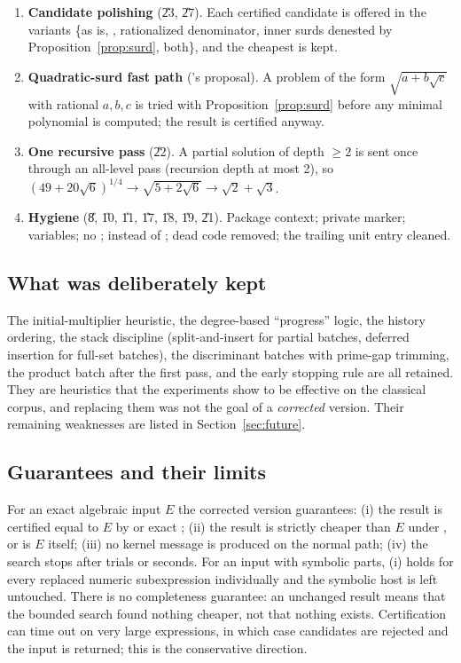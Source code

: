 \begin{enumerate}[label=\arabic*.]
      cheapest of \{input, result, , inner-surd
      variant\} that is certified equal to the input, and never anything more
      expensive than the input.
\item \textbf{Candidate polishing} (\U{23}, \U{27}). Each certified candidate
      is offered in the variants \{as is, , rationalized
      denominator, inner surds denested by Proposition~\ref{prop:surd}, both\},
      and the cheapest is kept.
\item \textbf{Quadratic-surd fast path} (\RIII's proposal). A problem of the
      form $\sqrt{a+b\sqrt c}$ with rational $a,b,c$ is tried with
      Proposition~\ref{prop:surd} before any minimal polynomial is computed;
      the result is certified anyway.
\item \textbf{One recursive pass} (\U{22}). A partial solution of depth $\ge2$
      is sent once through an all-level pass (recursion depth at most 2), so
      $(49+20\sqrt6)^{1/4}\to\sqrt{5+2\sqrt6}\to\sqrt2+\sqrt3$.
\item \textbf{Hygiene} (\U{8}, \U{10}, \U{11}, \U{17}, \U{18}, \U{19}, \U{21}).
      Package context; private marker;  variables; no
      ;  instead of ; dead code
      removed; the trailing unit entry cleaned.
\end{enumerate}

\subsection{What was deliberately kept}
The initial-multiplier heuristic, the degree-based ``progress'' logic, the
history ordering, the stack discipline (split-and-insert for partial batches,
deferred insertion for full-set batches), the discriminant batches with
prime-gap trimming, the product batch after the first pass, and the early
stopping rule are all retained. They are heuristics that the experiments show
to be effective on the classical corpus, and replacing them was not the goal
of a \emph{corrected} version. Their remaining weaknesses are listed in
Section~\ref{sec:future}.

\subsection{Guarantees and their limits}
For an exact algebraic input $E$ the corrected version guarantees: (i) the
result is certified equal to $E$ by  or exact
; (ii) the result is strictly cheaper than $E$ under
, or is $E$ itself; (iii) no kernel message is produced on
the normal path; (iv) the search stops after  trials or
 seconds. For an input with symbolic parts, (i) holds for
every replaced numeric subexpression individually and the symbolic host is
left untouched. There is no completeness guarantee: an unchanged result means
that the bounded search found nothing cheaper, not that nothing exists.
Certification can time out on very large expressions, in which case candidates
are rejected and the input is returned; this is the conservative direction.

